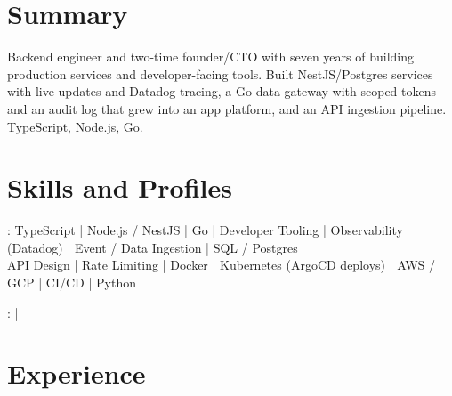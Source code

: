 \documentclass[print]{jack-resume}
\begin{document}
\pagecolor{darkmodeBackground}


\begin{minipage}[t][1cm][t]{.03\textwidth}
    \hfill
\end{minipage}

\section{Summary}
Backend engineer and two-time founder/CTO with seven years of building production services and developer-facing tools. Built NestJS/Postgres services with live updates and Datadog tracing, a Go data gateway with scoped tokens and an audit log that grew into an app platform, and an API ingestion pipeline. TypeScript, Node.js, Go.
\sectionsep

\section{Skills and Profiles}
:
TypeScript \hfill | \hfill
Node.js / NestJS \hfill | \hfill
Go \hfill | \hfill
Developer Tooling \hfill | \hfill
Observability (Datadog) \hfill | \hfill
Event / Data Ingestion \hfill | \hfill
SQL / Postgres \\
\hspace{1.0cm} API Design \hfill | \hfill
Rate Limiting \hfill | \hfill
Docker \hfill | \hfill
Kubernetes (ArgoCD deploys) \hfill | \hfill
AWS / GCP \hfill | \hfill
CI/CD \hfill | \hfill
Python \\

\raggedright{
    :
      \href{https://www.linkedin.com/in/jack-sturtevant/}{ \ExternalLink} |
     \href{https://github.com/jacksturt}{ \ExternalLink}}

\section{Experience}
\end{document}

